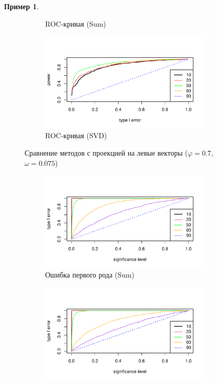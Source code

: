 \documentclass[specialist,
substylefile = spbu_report.rtx,
subf,href,colorlinks=true, 12pt]{disser}
\theoremstyle{definition}
\newtheorem{example}{Пример}
\begin{document}
\begin{example}
\begin{figure}[ht]
\begin{subfigure}[t]{0.5\textwidth}
		\caption{ROC-кривая (Sum)}
		\label{fig:sum_ev_r}
	\end{subfigure}\hspace{\fill}
	\begin{subfigure}[t]{0.5\textwidth}
		\centering
		\includegraphics[width=0.9\textwidth]{img/roc_mssa_ev.pdf}
		\caption{ROC-кривая (SVD)}
	\end{subfigure}
	\caption{Сравнение методов с проекцией на левые векторы ($\varphi=0.7$, $\omega=0.075$)}
	\label{fig:sum_ev}
\end{figure}
\begin{figure}[ht]
	\captionsetup[subfigure]{justification=Centering}
	\begin{subfigure}[t]{0.5\textwidth}
		\centering
		\includegraphics[width=0.9\textwidth]{img/type1error_sum_fa.pdf}
		\caption{Ошибка первого рода (Sum)}
		\label{fig:sum_fa_a}
	\end{subfigure}\hspace{\fill}
	\begin{subfigure}[t]{0.5\textwidth}
		\centering
		\includegraphics[width=0.9\textwidth]{img/type1error_mssa_fa.pdf}

\end{subfigure}
\end{figure}
\end{example}
\end{document}
